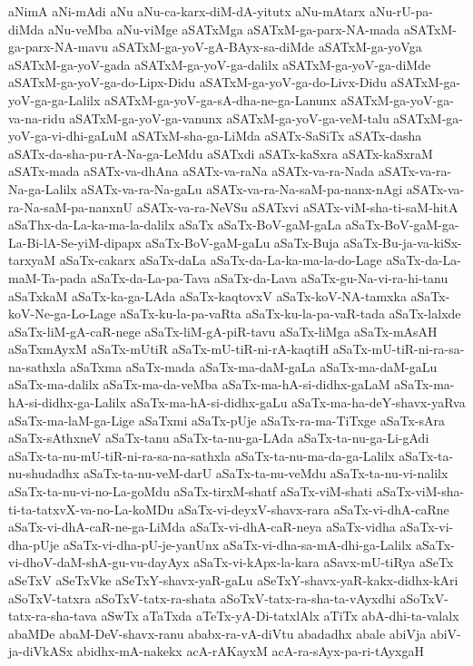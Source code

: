 {aNimA
aNi-mAdi
aNu
aNu-ca-karx-diM-dA-yitutx
aNu-mAtarx
aNu-rU-pa-diMda
aNu-veMba
aNu-viMge
aSATxMga
aSATxM-ga-parx-NA-mada
aSATxM-ga-parx-NA-mavu
aSATxM-ga-yoV-gA-BAyx-sa-diMde
aSATxM-ga-yoVga
aSATxM-ga-yoV-gada
aSATxM-ga-yoV-ga-dalilx
aSATxM-ga-yoV-ga-diMde
aSATxM-ga-yoV-ga-do-Lipx-Didu
aSATxM-ga-yoV-ga-do-Livx-Didu
aSATxM-ga-yoV-ga-ga-Lalilx
aSATxM-ga-yoV-ga-sA-dha-ne-ga-Lanunx
aSATxM-ga-yoV-ga-va-na-ridu
aSATxM-ga-yoV-ga-vanunx
aSATxM-ga-yoV-ga-veM-talu
aSATxM-ga-yoV-ga-vi-dhi-gaLuM
aSATxM-sha-ga-LiMda
aSATx-SaSiTx
aSATx-dasha
aSATx-da-sha-pu-rA-Na-ga-LeMdu
aSATxdi
aSATx-kaSxra
aSATx-kaSxraM
aSATx-mada
aSATx-va-dhAna
aSATx-va-raNa
aSATx-va-ra-Nada
aSATx-va-ra-Na-ga-Lalilx
aSATx-va-ra-Na-gaLu
aSATx-va-ra-Na-saM-pa-nanx-nAgi
aSATx-va-ra-Na-saM-pa-nanxnU
aSATx-va-ra-NeVSu
aSATxvi
aSATx-viM-sha-ti-saM-hitA
aSaThx-da-La-ka-ma-la-dalilx
aSaTx
aSaTx-BoV-gaM-gaLa
aSaTx-BoV-gaM-ga-La-Bi-lA-Se-yiM-dipapx
aSaTx-BoV-gaM-gaLu
aSaTx-Buja
aSaTx-Bu-ja-va-kiSx-tarxyaM
aSaTx-cakarx
aSaTx-daLa
aSaTx-da-La-ka-ma-la-do-Lage
aSaTx-da-La-maM-Ta-pada
aSaTx-da-La-pa-Tava
aSaTx-da-Lava
aSaTx-gu-Na-vi-ra-hi-tanu
aSaTxkaM
aSaTx-ka-ga-LAda
aSaTx-kaqtovxV
aSaTx-koV-NA-tamxka
aSaTx-koV-Ne-ga-Lo-Lage
aSaTx-ku-la-pa-vaRta
aSaTx-ku-la-pa-vaR-tada
aSaTx-lalxde
aSaTx-liM-gA-caR-nege
aSaTx-liM-gA-piR-tavu
aSaTx-liMga
aSaTx-mAsAH
aSaTxmAyxM
aSaTx-mUtiR
aSaTx-mU-tiR-ni-rA-kaqtiH
aSaTx-mU-tiR-ni-ra-sa-na-sathxla
aSaTxma
aSaTx-mada
aSaTx-ma-daM-gaLa
aSaTx-ma-daM-gaLu
aSaTx-ma-dalilx
aSaTx-ma-da-veMba
aSaTx-ma-hA-si-didhx-gaLaM
aSaTx-ma-hA-si-didhx-ga-Lalilx
aSaTx-ma-hA-si-didhx-gaLu
aSaTx-ma-ha-deY-shavx-yaRva
aSaTx-ma-laM-ga-Lige
aSaTxmi
aSaTx-pUje
aSaTx-ra-ma-TiTxge
aSaTx-sAra
aSaTx-sAthxneV
aSaTx-tanu
aSaTx-ta-nu-ga-LAda
aSaTx-ta-nu-ga-Li-gAdi
aSaTx-ta-nu-mU-tiR-ni-ra-sa-na-sathxla
aSaTx-ta-nu-ma-da-ga-Lalilx
aSaTx-ta-nu-shudadhx
aSaTx-ta-nu-veM-darU
aSaTx-ta-nu-veMdu
aSaTx-ta-nu-vi-nalilx
aSaTx-ta-nu-vi-no-La-goMdu
aSaTx-tirxM-shatf
aSaTx-viM-shati
aSaTx-viM-sha-ti-ta-tatxvX-va-no-La-koMDu
aSaTx-vi-deyxV-shavx-rara
aSaTx-vi-dhA-caRne
aSaTx-vi-dhA-caR-ne-ga-LiMda
aSaTx-vi-dhA-caR-neya
aSaTx-vidha
aSaTx-vi-dha-pUje
aSaTx-vi-dha-pU-je-yanUnx
aSaTx-vi-dha-sa-mA-dhi-ga-Lalilx
aSaTx-vi-dhoV-daM-shA-gu-vu-dayAyx
aSaTx-vi-kApx-la-kara
aSavx-mU-tiRya
aSeTx
aSeTxV
aSeTxVke
aSeTxY-shavx-yaR-gaLu
aSeTxY-shavx-yaR-kakx-didhx-kAri
aSoTxV-tatxra
aSoTxV-tatx-ra-shata
aSoTxV-tatx-ra-sha-ta-vAyxdhi
aSoTxV-tatx-ra-sha-tava
aSwTx
aTaTxda
aTeTx-yA-Di-tatxlAlx
aTiTx
abA-dhi-ta-valalx
abaMDe
abaM-DeV-shavx-ranu
ababx-ra-vA-diVtu
abadadhx
abale
abiVja
abiV-ja-diVkASx
abidhx-mA-nakekx
acA-rAKayxM
acA-ra-sAyx-pa-ri-tAyxgaH
}
